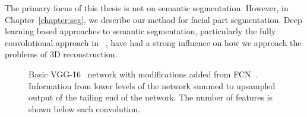 The primary focus of this thesis is not on semantic
segmentation. However, in Chapter~\ref{chapter:seg}, we describe our
method for facial part segmentation. Deep learning based approaches to
semantic segmentation, particularly the fully convolutional approach
in ~\cite{long2015fully}, have had a strong influence on how we
approach the problems of 3D reconstruction.



\begin{figure}
  \centering
\caption[The VGG-16 network]{Basic VGG-16~\cite{simonyan2014vgg}
  network with modifications added from
  FCN~\cite{long2015fully}. Information from lower levels of the
  network summed to upsampled output of the tailing end of the
  network. The number of features is shown below each convolution.}
\label{fig:background:fcn}
\end{figure}











